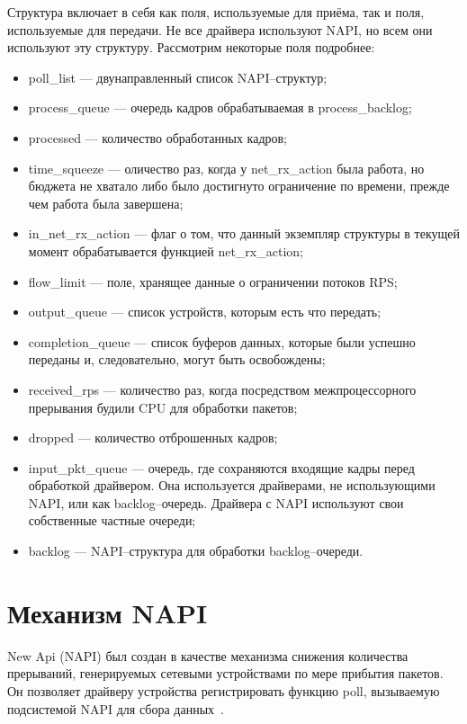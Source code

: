 Структура включает в себя как поля, используемые для приёма, так и поля, используемые для передачи. Не все драйвера используют NAPI, но всем они используют эту структуру. Рассмотрим некоторые поля подробнее:
\begin{itemize}[label=---]
	\item poll\_list --- двунаправленный список NAPI--структур;
	\item process\_queue --- очередь кадров обрабатываемая в process\_backlog;
	\item processed --- количество обработанных кадров;
	\item time\_squeeze --- оличество раз, когда у net\_rx\_action была работа, но бюджета не хватало либо было достигнуто ограничение по времени, прежде чем работа была завершена;
	\item in\_net\_rx\_action --- флаг о том, что данный экземпляр структуры в текущей момент обрабатывается функцией  net\_rx\_action;
	\item flow\_limit --- поле, хранящее данные о ограничении потоков RPS;
	\item output\_queue --- список устройств, которым есть что передать;
	\item completion\_queue --- список буферов данных, которые были успешно переданы и, следовательно, могут быть освобождены;
	\item received\_rps --- количество раз, когда посредством межпроцессорного прерывания будили CPU для обработки пакетов;
	\item dropped --- количество отброшенных кадров;
	\item input\_pkt\_queue --- очередь, где сохраняются входящие кадры перед обработкой драйвером. Она используется драйверами, не использующими NAPI, или как backlog--очередь. Драйвера с NAPI используют свои собственные частные очереди;
	\item backlog --- NAPI--структура для обработки backlog--очереди.
\end{itemize}

\section{Механизм NAPI}

New Api (NAPI) был создан в качестве механизма снижения количества прерываний, генерируемых сетевыми устройствами по мере прибытия пакетов. Он позволяет драйверу устройства регистрировать функцию poll, вызываемую подсистемой NAPI для сбора данных~\cite{rec}.

